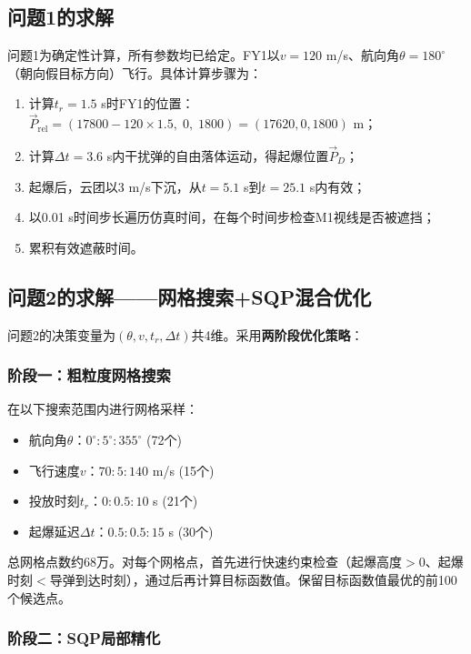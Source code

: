 
\subsection{问题1的求解}

问题1为确定性计算，所有参数均已给定。FY1以$v=120$ m/s、航向角$\theta=180^\circ$（朝向假目标方向）飞行。具体计算步骤为：

\begin{enumerate}[label=步骤\arabic*：]
    \item 计算$t_r=1.5$ s时FY1的位置：$\vec{P}_{\text{rel}} = (17800 - 120 \times 1.5,\; 0,\; 1800) = (17620, 0, 1800)$ m；
    \item 计算$\Delta t = 3.6$ s内干扰弹的自由落体运动，得起爆位置$\vec{P}_D$；
    \item 起爆后，云团以3 m/s下沉，从$t=5.1$ s到$t=25.1$ s内有效；
    \item 以0.01 s时间步长遍历仿真时间，在每个时间步检查M1视线是否被遮挡；
    \item 累积有效遮蔽时间。
\end{enumerate}

\subsection{问题2的求解——网格搜索+SQP混合优化}

问题2的决策变量为$(\theta, v, t_r, \Delta t)$共4维。采用\textbf{两阶段优化策略}：

\subsubsection{阶段一：粗粒度网格搜索}

在以下搜索范围内进行网格采样：
\begin{itemize}
    \item 航向角$\theta$：$0^\circ:5^\circ:355^\circ$ (72个)
    \item 飞行速度$v$：$70:5:140$ m/s (15个)
    \item 投放时刻$t_r$：$0:0.5:10$ s (21个)
    \item 起爆延迟$\Delta t$：$0.5:0.5:15$ s (30个)
\end{itemize}

总网格点数约68万。对每个网格点，首先进行快速约束检查（起爆高度$>0$、起爆时刻$<$导弹到达时刻），通过后再计算目标函数值。保留目标函数值最优的前100个候选点。

\subsubsection{阶段二：SQP局部精化}

